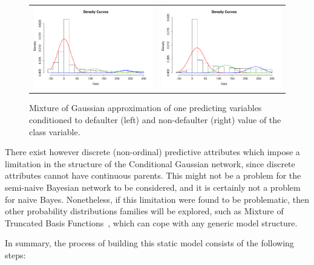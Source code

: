 \begin{figure}[htbp]
  \centering
    \begin{tabular}{cc}
    \includegraphics[width=70mm]{figures/CajaMarmixtureBalanceDef}&
    \includegraphics[width=70mm]{figures/CajaMarmixtureBalanceNonDef}\\
  \end{tabular}
    \caption{\label{Figure:cajamarMixt}Mixture of Gaussian approximation of one predicting variables conditioned to defaulter (left) and non-defaulter (right) value of the class variable.}
\end{figure}

There exist however discrete (non-ordinal) predictive attributes which impose a limitation in the structure of the Conditional Gaussian network, since discrete attributes cannot have continuous parents. This might not be a problem for the semi-naive Bayesian network to be considered, and it is certainly not a problem for naive Bayes. Nonetheless, if this limitation were found to be problematic, then other probability distributions families will be explored, such as Mixture of Truncated Basis Functions~\cite{Lan12}, which can cope with any generic model structure. 

In summary, the process of building this static model consists of the following steps:

